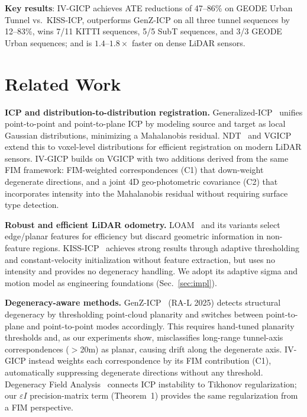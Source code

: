 \documentclass[letterpaper, 10pt, conference]{ieeeconf}
\begin{document}
\textbf{Key results}: IV-GICP achieves ATE reductions of 47--86\% on GEODE
Urban Tunnel vs.\ KISS-ICP, outperforms GenZ-ICP on all three tunnel sequences
by 12--83\%, wins 7/11 KITTI sequences, 5/5 SubT sequences, and 3/3 GEODE
Urban sequences; and is $1.4$--$1.8\times$ faster on dense LiDAR sensors.

\section{Related Work}\label{sec:related}

\textbf{ICP and distribution-to-distribution registration.}
Generalized-ICP~\cite{segal2009generalized} unifies point-to-point and
point-to-plane ICP by modeling source and target as local Gaussian distributions,
minimizing a Mahalanobis residual.
NDT~\cite{biber2003ndt} and VGICP~\cite{koide2021voxel} extend this to
voxel-level distributions for efficient registration on modern LiDAR sensors.
IV-GICP builds on VGICP with two additions derived from the same FIM framework:
FIM-weighted correspondences (C1) that down-weight degenerate directions, and
a joint 4D geo-photometric covariance (C2) that incorporates intensity into
the Mahalanobis residual without requiring surface type detection.

\textbf{Robust and efficient LiDAR odometry.}
LOAM~\cite{zhang2014loam} and its variants select edge/planar features for
efficiency but discard geometric information in non-feature regions.
KISS-ICP~\cite{vizzo2023kiss} achieves strong results through adaptive
thresholding and constant-velocity initialization without feature extraction,
but uses no intensity and provides no degeneracy handling.
We adopt its adaptive sigma and motion model as engineering foundations
(Sec.~\ref{sec:impl}).

\textbf{Degeneracy-aware methods.}
GenZ-ICP~\cite{zhang2024genz} (RA-L 2025) detects structural degeneracy by
thresholding point-cloud planarity and switches between point-to-plane and
point-to-point modes accordingly.
This requires hand-tuned planarity thresholds and, as our experiments show,
misclassifies long-range tunnel-axis correspondences ($>$20m) as planar,
causing drift along the degenerate axis.
IV-GICP instead weights each correspondence by its FIM contribution (C1),
automatically suppressing degenerate directions without any threshold.
Degeneracy Field Analysis~\cite{vizzo2024degeneracy} connects ICP instability
to Tikhonov regularization; our $\varepsilon I$ precision-matrix term
(Theorem~1) provides the same regularization from a FIM perspective.
\end{document}
